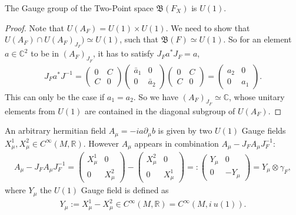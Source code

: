 \begin{myproposition}
The Gauge group of the Two-Point space $\mathfrak{B}(F_X)$ is $U(1)$.
\end{myproposition}
\begin{proof}
    Note that $U(A_F) = U(1) \times U(1)$. We need to show that $U(A_F) \cap
    U(A_F)_{J_F}) \simeq U(1)$, such that $\mathfrak{B}(F) \simeq U(1)$. So
    for an element $a \in \mathbb{C}^2$ to be in $(A_F)_{J_F}$, it has to
    satisfy $J_F a^* J_F = a$,
    \begin{align}
        J_F a^* J^{-1} =
        \begin{pmatrix}0&C\\C&0\end{pmatrix}
            \begin{pmatrix}\bar{a}_1&0\\0&\bar{a}_2\end{pmatrix}
        \begin{pmatrix}0&C\\C&0\end{pmatrix}
            =
            \begin{pmatrix}a_2&0\\0&a_1\end{pmatrix}.
    \end{align}
    This can only be the case if $a_1 = a_2$. So we have
    $(A_F)_{J_F} \simeq \mathbb{C}$, whose unitary elements
    from $U(1)$ are contained in the diagonal subgroup of
    $U(A_F)$.
\end{proof}

An arbitrary hermitian field $A_\mu = -ia\partial _\mu b$  is given by
two $U(1)$ Gauge fields $X_\mu^1, X_\mu^2 \in C^\infty(M, \mathbb{R})$.
However $A_\mu$ appears in combination $A_\mu - J_F A_\mu J_F^{-1}$:
\begin{align}
 A_\mu - J_F A_\mu J_F^{-1} =
    \begin{pmatrix}X_\mu^1&0\\0&X_\mu^2 \end{pmatrix}
        -
    \begin{pmatrix}X_\mu^2&0\\0&X_\mu^1 \end{pmatrix}
        =:
    \begin{pmatrix}Y_\mu&0\\0&-Y_\mu \end{pmatrix}
    = Y_\mu \otimes \gamma _F,
\end{align}
where $Y_\mu$ the $U(1)$ Gauge field is defined as
\begin{align}
    Y_\mu := X_\mu^1 - X_\mu^2 \in C^\infty(M, \mathbb{R}) = C^\infty(M,
    i\ u(1)).
\end{align}

